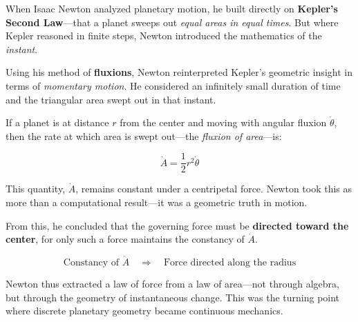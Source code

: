 \begin{tcolorbox}[colback=gray!5!white, colframe=black, title=\textbf{Historical Sidebar: Newton’s Fluxions and the Geometry of Instantaneous Motion}, fonttitle=\bfseries, arc=1.5mm, boxrule=0.4pt]

  When Isaac Newton analyzed planetary motion, he built directly on \textbf{Kepler’s Second Law}—that a planet sweeps out \textit{equal areas in equal times}. But where Kepler reasoned in finite steps, Newton introduced the mathematics of the \textit{instant}.
  
  Using his method of \textbf{fluxions}, Newton reinterpreted Kepler’s geometric insight in terms of \textit{momentary motion}. He considered an infinitely small duration of time and the triangular area swept out in that instant.
  
  \vspace{0.5em}
  If a planet is at distance \( r \) from the center and moving with angular fluxion \( \dot{\theta} \), then the rate at which area is swept out—the \textit{fluxion of area}—is:
  
  \[
  \dot{A} = \frac{1}{2} r^2 \dot{\theta}
  \]
  
  This quantity, \( \dot{A} \), remains constant under a centripetal force. Newton took this as more than a computational result—it was a geometric truth in motion.
  
  \vspace{0.5em}
  From this, he concluded that the governing force must be \textbf{directed toward the center}, for only such a force maintains the constancy of \( \dot{A} \).
  
  \[
  \text{Constancy of } \dot{A} \quad \Rightarrow \quad \text{Force directed along the radius}
  \]
  
  Newton thus extracted a law of force from a law of area—not through algebra, but through the geometry of instantaneous change. This was the turning point where discrete planetary geometry became continuous mechanics.
  
\end{tcolorbox}
 
